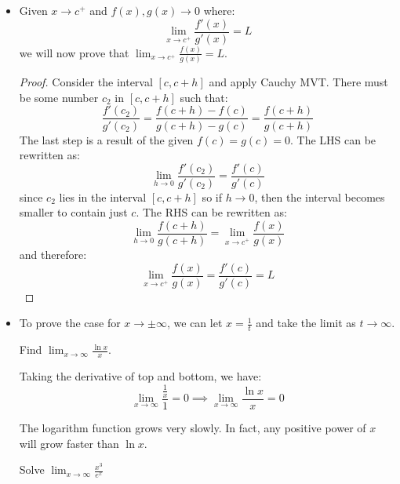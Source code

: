 \begin{itemize}
\begin{proof}
\begin{equation}
        \end{equation}
        Furthermore, we have $g'(c) = \frac{g(b)-g(a)}{b-a}$ from the mean value theorem. Since $g' \neq 0$ we have $g(b)-g(a) \neq 0$. 
    \end{proof}
    \item Given $x \to c^+$ and $f(x),g(x) \to 0$ where:
    \begin{equation}
        \lim_{x\to c^+} \frac{f'(x)}{g'(x)} = L
    \end{equation}
    we will now prove that $\lim_{x\to c^+} \frac{f(x)}{g(x)} = L$.
    \begin{proof}
        Consider the interval $[c, c+h]$ and apply Cauchy MVT. There must be some number $c_2$ in $[c, c+h]$ such that:
        \begin{equation}
            \frac{f'(c_2)}{g'(c_2)} = \frac{f(c+h)-f(c)}{g(c+h)-g(c)} = \frac{f(c+h)}{g(c+h)}
        \end{equation}
        The last step is a result of the given $f(c)=g(c)=0$. The LHS can be rewritten as:
        \begin{equation}
            \lim_{h\to 0} \frac{f'(c_2)}{g'(c_2)} = \frac{f'(c)}{g'(c)}
        \end{equation}
        since $c_2$ lies in the interval $[c, c+h]$ so if $h\to 0$, then the interval becomes smaller to contain just $c$. The RHS can be rewritten as:
        \begin{equation}
            \lim_{h\to 0} \frac{f(c+h)}{g(c+h)} = \lim_{x\to c^+} \frac{f(x)}{g(x)}
        \end{equation}
        and therefore:
        \begin{equation}
            \lim_{x\to c^+} \frac{f(x)}{g(x)} = \frac{f'(c)}{g'(c)} = L
        \end{equation}
    \end{proof}
    \item To prove the case for $x \to \pm \infty$, we can let $x = \frac{1}{t}$ and take the limit as $t \to \infty$.
    \begin{example}
        Find $\lim_{x\to\infty} \frac{\ln x}{x}$.
        \vspace{2mm}

        Taking the derivative of top and bottom, we have:
        \begin{equation}
            \lim_{x\to \infty} \frac{\frac{1}{x}}{1} = 0 \implies \lim_{x\to \infty} \frac{\ln x}{x} =0
        \end{equation}
    \end{example}
    \begin{idea}
        The logarithm function grows very slowly. In fact, any positive power of $x$ will grow faster than $\ln x$.
    \end{idea}
    \begin{example}
        Solve $\lim_{x\to \infty} \frac{x^3}{e^x}$
        \vspace{2mm}


\end{example}
\end{itemize}

